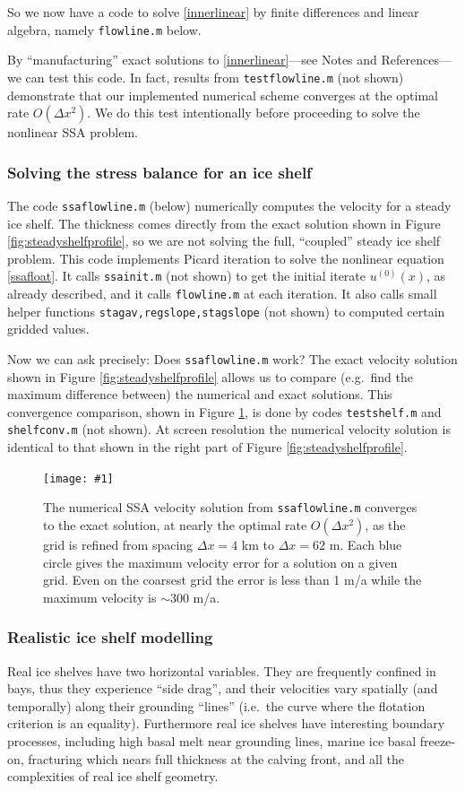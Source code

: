 \documentclass[titlepage,a4paper,final,12pt]{scrartcl}
\newcommand{\minput}[1]{
\bigskip
\begin{quote}
\bigskip
\VerbatimInput[frame=single,framesep=3mm,label=\fbox{\normalsize \textsl{\,#1.m\,}},fontfamily=courier,fontsize=\scriptsize]{../mfiles/#1.slim.m}
\bigskip
\end{quote}
}
\newcommand{\onefigsize}[3]{
\begin{figure}[ht]
\centering
\texttt{[image: \#1]}
\caption{#2}
\label{fig:#1}
\end{figure}}
\newcommand{\onefig}[2]{\onefigsize{#1}{#2}{3.0in}}
\begin{document}
So we now have a code to solve \eqref{innerlinear} by finite differences and linear algebra, namely \texttt{flowline.m} below.

\minput{flowline}

By ``manufacturing'' exact solutions to \eqref{innerlinear}---see Notes and References---we can test this code.   In fact, results from \texttt{testflowline.m} (not shown) demonstrate that our implemented numerical scheme converges at the optimal rate $O(\Delta x^2)$.  We do this test intentionally before proceeding to solve the nonlinear SSA problem.

\subsubsection*{Solving the stress balance for an ice shelf}  The code \texttt{ssaflowline.m} (below) numerically computes the velocity for a steady ice shelf.  The thickness comes directly from the exact solution shown in Figure \ref{fig:steadyshelfprofile}, so we are not solving the full, ``coupled'' steady ice shelf problem.  This code implements Picard iteration to solve the nonlinear equation \eqref{ssafloat}.  It calls \texttt{ssainit.m} (not shown) to get the initial iterate $u^{(0)}(x)$, as already described, and it calls \texttt{flowline.m} at each iteration.  It also calls small helper functions \texttt{stagav,regslope,stagslope} (not shown) to computed certain gridded values.

\minput{ssaflowline}

Now we can ask precisely: Does \texttt{ssaflowline.m} work?  The exact velocity solution shown in Figure \ref{fig:steadyshelfprofile} allows us to compare (e.g.~find the maximum difference between) the numerical and exact solutions.  This convergence comparison, shown in Figure \ref{fig:shelfconv}, is done by codes \texttt{testshelf.m} and \texttt{shelfconv.m} (not shown).  At screen resolution the numerical velocity solution is identical to that shown in the right part of Figure \ref{fig:steadyshelfprofile}.

\onefig{shelfconv}{The numerical SSA velocity solution from \texttt{ssaflowline.m} converges to the exact solution, at nearly the optimal rate $O(\Delta x^2)$, as the grid is refined from spacing $\Delta x=4$ km to $\Delta x=62$ m.  Each blue circle gives the maximum velocity error for a solution on a given grid.  Even on the coarsest grid the error is less than 1 m/a while the maximum velocity is $\sim 300$ m/a.}


\subsubsection*{Realistic ice shelf modelling}  Real ice shelves have two horizontal variables.  They are frequently confined in bays, thus they experience ``side drag'', and their velocities vary spatially (and temporally) along their grounding ``lines'' (i.e.~the curve where the flotation criterion is an equality).  Furthermore real ice shelves have interesting boundary processes, including high basal melt near grounding lines, marine ice basal freeze-on, fracturing which nears full thickness at the calving front, and all the complexities of real ice shelf geometry.
\end{document}
